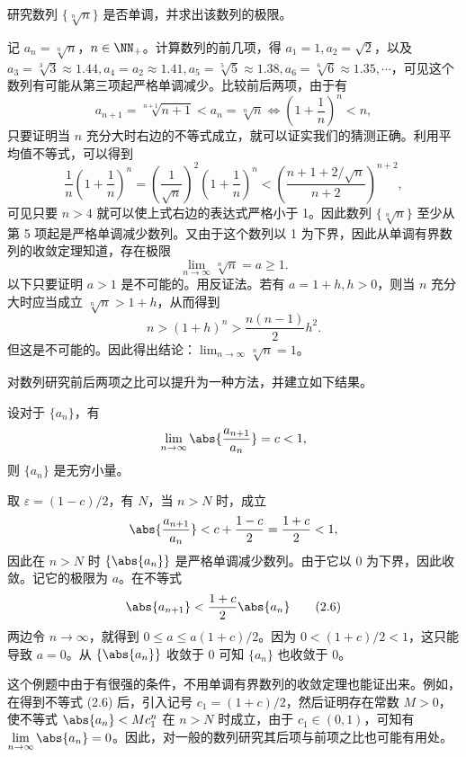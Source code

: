 \begin{xexample}[2.3.2]
研究数列 $\{\sqrt[n]{n}\}$ 是否单调，并求出该数列的极限。
\end{xexample}
\begin{xproof}
记 $a_n=\sqrt[n]{n}$，$n\in\NN_+$。计算数列的前几项，得 $a_1=1,a_2=\sqrt2$，以及 $a_3=\sqrt[3]3\approx1.44,a_4=a_2\approx1.41,a_5=\sqrt[5]5\approx1.38,a_6=\sqrt[6]6\approx1.35,\cdots$，可见这个数列有可能从第三项起严格单调减少。比较前后两项，由于有
\[
  a_{n+1}=\sqrt[n+1]{n+1}<a_n=\sqrt[n]n
  \Longleftrightarrow
  \left(1+\frac1n\right)^n<n,
\]
只要证明当 $n$ 充分大时右边的不等式成立，就可以证实我们的猜测正确。利用平均值不等式，可以得到
\[
  \frac1n\left(1+\frac1n\right)^n
  =\left(\frac1{\sqrt n}\right)^2\left(1+\frac1n\right)^n
  <\left(\frac{n+1+2/\sqrt n}{n+2}\right)^{n+2},
\]
可见只要 $n>4$ 就可以使上式右边的表达式严格小于 1。因此数列 $\{\sqrt[n]n\}$ 至少从第 5 项起是严格单调减少数列。又由于这个数列以 1 为下界，因此从单调有界数列的收敛定理知道，存在极限
\[
  \lim_{n\to\infty}\sqrt[n]n=a\ge1.
\]
以下只要证明 $a>1$ 是不可能的。用反证法。若有 $a=1+h,h>0$，则当 $n$ 充分大时应当成立 $\sqrt[n]n>1+h$，从而得到
\[
  n>(1+h)^n>\frac{n(n-1)}2h^2.
\]
但这是不可能的。因此得出结论：$\displaystyle\lim_{n\to\infty}\sqrt[n]n=1$。
\end{xproof}

对数列研究前后两项之比可以提升为一种方法，并建立如下结果。

\begin{xexample}[2.3.3]
设对于 $\{a_n\}$，有
\[
  \lim_{n\to\infty}\abs{\frac{a_{n+1}}{a_n}}=c<1,
\]
则 $\{a_n\}$ 是无穷小量。
\end{xexample}
\begin{xproof}
取 $\varepsilon=(1-c)/2$，有 $N$，当 $n>N$ 时，成立
\[
  \abs{\frac{a_{n+1}}{a_n}}<c+\frac{1-c}{2}=\frac{1+c}{2}<1,
\]
因此在 $n>N$ 时 $\{\abs{a_n}\}$ 是严格单调减少数列。由于它以 0 为下界，因此收敛。记它的极限为 $a$。在不等式
\begin{equation}
  \abs{a_{n+1}}<\frac{1+c}{2}\abs{a_n}
  \tag{2.6}
  \label{eq:2.6}
\end{equation}
两边令 $n\to\infty$，就得到 $0\le a\le a(1+c)/2$。因为 $0<(1+c)/2<1$，这只能导致 $a=0$。从 $\{\abs{a_n}\}$ 收敛于 0 可知 $\{a_n\}$ 也收敛于 0。
\end{xproof}

\begin{xremark}
这个例题中由于有很强的条件，不用单调有界数列的收敛定理也能证出来。例如，在得到不等式 (2.6) 后，引入记号 $c_1=(1+c)/2$，然后证明存在常数 $M>0$，使不等式 $\abs{a_n}<Mc_1^n$ 在 $n>N$ 时成立，由于 $c_1\in(0,1)$，可知有 $\displaystyle\lim_{n\to\infty}\abs{a_n}=0$。因此，对一般的数列研究其后项与前项之比也可能有用处。
\end{xremark}

